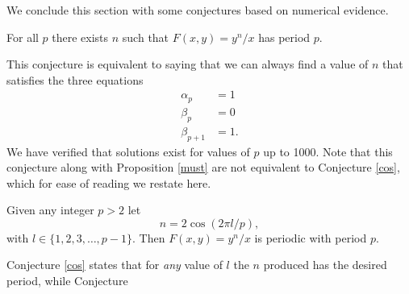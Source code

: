 \documentclass[12pt]{article}
\begin{document}
We conclude this section with some conjectures based on numerical evidence. 

\begin{conjecture} For all $p$ there exists $n$ such that $F(x,y)=y^n/x$ has period $p$. 
\end{conjecture} 
This conjecture is equivalent to saying that we can always find a value of $n$ that satisfies the three equations 
\begin{align*}
\alpha_p &=1\\ 
\beta_p &=0\\
\beta_{p+1} &=1.
\end{align*}
We have verified that solutions exist for values of $p$ up to 1000. Note that this conjecture along with Proposition \ref{must} are not equivalent to Conjecture \ref{cos}, which for ease of reading we restate here. 
\begin{conjecture}
Given any integer $p>2$ let 
\begin{equation*}
n = 2 \cos(2 \pi l/p),
\end{equation*}
with $l \in \{1,2,3, \ldots, p-1 \}$. Then $F(x,y) = y^n/x$ is periodic with period $p$.
\end{conjecture}
Conjecture \ref{cos} states that for \emph{any} value of $l$ the $n$ produced has the desired period, while Conjecture 
\end{document}
